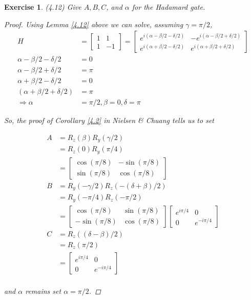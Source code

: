 \documentclass[11pt]{article}
\newcommand\0{\mathbf{0}}
\newcommand\<{\langle}
\renewcommand\>{\rangle}
\renewcommand\implies{\Rightarrow}
\newtheorem{exercise}[theorem]{Exercise}
\begin{document}
\begin{exercise} (4.12) Give $A, B, C$, and $\alpha$ for the Hadamard gate.

\begin{proof}
	Using Lemma \ref{4.12} above we can solve, assuming $\gamma = \pi / 2$, 
	\begin{align*}
		H &= \begin{bmatrix}
 1 & 1 \\ 1 & -1	
 \end{bmatrix} = \begin{bmatrix}
 	e^{i(\alpha - \beta / 2 - \delta / 2)} & -e^{i (\alpha - \beta /2 + \delta / 2)} \\ 
 	e^{i(\alpha + \beta / 2 - \delta / 2)} & e^{i (\alpha + \beta /2 + \delta / 2)}
 \end{bmatrix} \\ 
 \alpha - \beta / 2 - \delta / 2 &= 0 \\
 \alpha - \beta /2 + \delta / 2 &= \pi \\
 \alpha + \beta / 2 - \delta / 2 &= 0 \\
 (\alpha + \beta /2 + \delta / 2) &= \pi \\
 \implies \alpha &= \pi / 2, \beta = 0, \delta = \pi
	\end{align*}

So, the proof of Corollary \ref{4.2} in Nielsen \& Chuang tells us to set 

\begin{align*}
A &= R_z (\beta)R_y(\gamma / 2) \\
&= R_z (0)R_y(\pi / 4) \\
&= \begin{bmatrix}
 	\cos(\pi / 8) & -\sin(\pi / 8) \\
 	\sin(\pi / 8) & \cos(\pi / 8)
 \end{bmatrix}\\
B &= R_y(-\gamma/2)R_z(- (\delta+\beta)/2)\\
&= R_y(- \pi/4)R_z(- \pi/2)\\
&=  \begin{bmatrix}
 	\cos(\pi / 8) & \sin(\pi / 8) \\
 	-\sin(\pi / 8) & \cos(\pi / 8)
 \end{bmatrix} \begin{bmatrix}
 	e^{i\pi / 4} & 0 \\
 	0 & e^{- i\pi / 4}
 \end{bmatrix}\\
C &= R_z((\delta - \beta)/2)\\
&= R_z(\pi /2) \\
&= \begin{bmatrix}
 	e^{i\pi / 4} & 0 \\
 	0 & e^{- i\pi / 4}
 \end{bmatrix}\\
\end{align*}

and $\alpha$ remains set $\alpha = \pi / 2$.
\end{proof}

	
\end{exercise}
\end{document}
